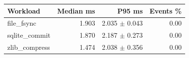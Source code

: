 \begin{tabular}{lrrr}
\toprule
Workload & Median ms & P95 ms & Events \% \\
\midrule
file\_fsync & 1.903 & 2.035 $\pm$ 0.043 & 0.00 \\
sqlite\_commit & 1.870 & 2.187 $\pm$ 0.273 & 0.00 \\
zlib\_compress & 1.474 & 2.038 $\pm$ 0.356 & 0.00 \\
\bottomrule
\end{tabular}
